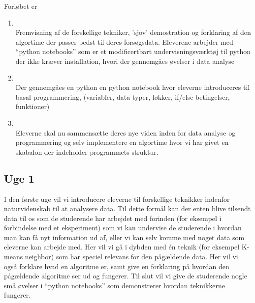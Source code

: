 \documentclass[11pt]{article}
\begin{document}
    Forløbet er
    \begin{enumerate}
        \item {} ~ \\
        Fremvisning af de forskellige tekniker, 'sjov' demostration og forklaring af den
        algortime der passer bedst til deres forsøgsdata.
        Eleverene arbejder med ``python notebooks'' som er et modificertbart
        undervisningsværktøj til python der ikke kræver installation, hvori der gennemgåes
        øvelser i data analyse


        \item {} ~ \\
        Der gennemgåes en python en python notebook hvor eleverne introduceres til
        basal programmering, (variabler, data-typer, løkker, if/else betingelser, funktioner)


        \item {} ~ \\
        Eleverne skal nu sammensætte deres nye viden inden for data analyse og programmering
        og selv implementere en algortime hvor vi har givet en skabalon der indeholder
        programmets struktur.
    \end{enumerate}

    \subsection{Uge 1}
        I den første uge vil vi introducere eleverne til forskellige teknikker 
        indenfor naturvidenskab til at analysere data. Til dette formål kan der 
        enten blive tilsendt data til os som de studerende har arbejdet med forinden 
        (for eksempel i forbindelse med et eksperiment) som vi kan undervise de 
        studerende i hvordan man kan få nyt information ud af, 
        eller vi kan selv komme med noget data som eleverne kan arbejde med. 
        Her vil vi gå i dybden med én teknik (for eksempel K-means neighbor) 
        som har speciel relevans for den pågældende data. Her vil vi også forklare 
        hvad en algoritme er, samt give en forklaring på hvordan den 
        pågældende algoritme ser ud og fungerer. Til slut vil vi give de 
        studerende nogle små øvelser i ``python notebooks'' som demonstrerer 
        hvordan teknikkerne fungerer.
       
\end{document}
